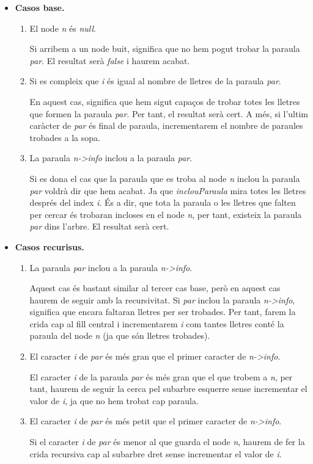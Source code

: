 \documentclass[titlepage]{article}
\begin{document}
\begin{itemize}
    \item \textbf{Casos base.}\par
    \begin{enumerate}
        \item El node \textit{n} és \textit{null}. \par
        Si arribem a un node buit, significa que no hem pogut trobar la paraula \textit{par}. El resultat serà \textit{false} i haurem acabat.
        \item Si es compleix que \textit{i} és igual al nombre de lletres de la paraula \textit{par}.\par
        En aquest cas, significa que hem sigut capaços de trobar totes les lletres que formen la paraula \textit{par}. Per tant, el resultat serà cert. A més, si l'ultim caràcter de \textit{par} és final de paraula, incrementarem el nombre de paraules trobades a la sopa.
        \item La paraula \textit{n->info} inclou a la paraula \textit{par}.\par
        Si es dona el cas que la paraula que es troba al node \textit{n} inclou la paraula \textit{par} voldrà dir que hem acabat. Ja que \textit{inclouParaula} mira totes les lletres després del index \textit{i}. És a dir, que tota la paraula o les lletres que falten per cercar és trobaran incloses en el node \textit{n}, per tant, existeix la paraula \textit{par} dins l'arbre. El resultat serà cert.
    \end{enumerate}
    \item \textbf{Casos recurisus.}
    \begin{enumerate}
        \item La paraula \textit{par} inclou a la paraula \textit{n->info}. \par
        Aquest cas és bastant similar al tercer cas base, però en aquest cas haurem de seguir amb la recursivitat. Si \textit{par} inclou la paraula \textit{n->info}, significa que encara faltaran lletres per ser trobades. Per tant, farem la crida cap al fill central i incrementarem \textit{i} com tantes lletres conté la paraula del node \textit{n} (ja que són lletres trobades).
        \item El caracter \textit{i} de \textit{par} és més gran que el primer caracter de \textit{n->info}.\par
        El caracter \textit{i} de la paraula \textit{par} és més gran que el que trobem a \textit{n}, per tant, haurem de seguir la cerca pel subarbre esquerre sense incrementar el valor de \textit{i}, ja que no hem trobat cap paraula.
        \item El caracter \textit{i} de \textit{par} és més petit que el primer caracter de \textit{n->info}.\par
        Si el caracter \textit{i} de \textit{par} és menor al que guarda el node \textit{n}, haurem de fer la crida recursiva cap al subarbre dret sense incrementar el valor de \textit{i}.
    \end{enumerate}
\end{itemize}
\end{document}
